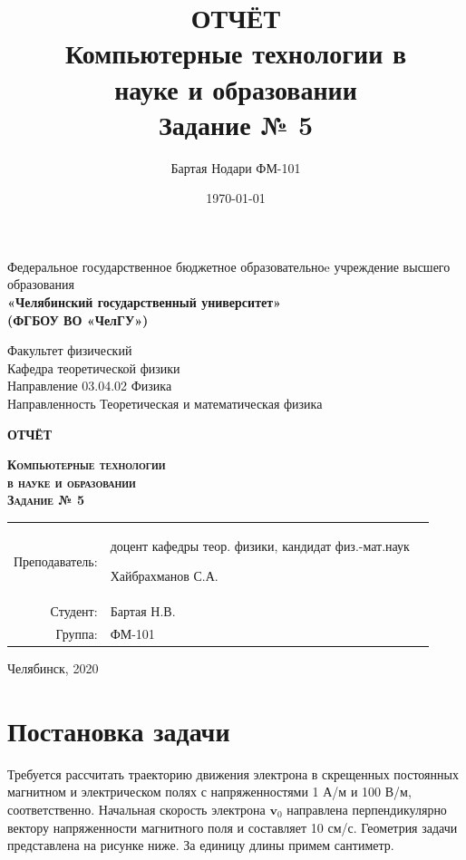\documentclass[a4paper]{article}
\author{Бартая Нодари ФМ-101}
\title{ОТЧЁТ\\ Компьютерные технологии в\\ науке и образовании\\ Задание № 5}
\date{\today}
\begin{document}
\begin{titlepage}
	\begin{center}
	Федеральное государственное бюджетное образовательноe учреждение высшего образования \\
	\textbf{«Челябинский государственный университет» \\ (ФГБОУ ВО «ЧелГУ»)}
	\end{center}
	\begin{center}
		Факультет физический			\\
		Кафедра теоретической физики	\\
		Направление 03.04.02 Физика		\\
		Направленность Теоретическая и математическая физика
	\end{center}
	\vfill
	\begin{center}
		\textbf{ОТЧЁТ}
	\end{center}
	\begin{center}
		\textsc{\textbf{Компьютерные технологии\\ в науке и образовании\\ Задание № 5}}
	\end{center}
	\vfill
	\singlespace
	\begin{flushright}
	\begin{tabular}{r p{}l}
		Преподаватель:&	доцент кафедры теор. физики, кандидат физ.-мат.наук 
		
		Хайбрахманов С.А. \\[5pt]
		Студент:&	Бартая Н.В.		\\[5pt]
		Группа:& 	ФМ-101			\\
	\end{tabular}
	\end{flushright}
	\onehalfspacing
	\vfill
	\begin{center}
		Челябинск, 2020	
	\end{center}
\end{titlepage}

\tableofcontents
\setcounter{page}{2}
\newpage
\section{Постановка задачи}\label{Problem}
Требуется рассчитать траекторию движения электрона в скрещенных
постоянных магнитном и электрическом полях с напряженностями 1 А/м и 100 В/м, соответственно. 
Начальная скорость электрона $\mathbf{v}_0$ направлена перпендикулярно вектору напряженности магнитного поля и составляет 10 см/с.
Геометрия задачи представлена на рисунке ниже. За единицу длины примем сантиметр.
\end{document}
